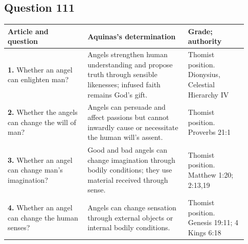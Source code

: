 \subsection{Question 111}
\begin{longtable}{@{}>{\raggedright\arraybackslash}p{0.31\linewidth}>{\raggedright\arraybackslash}p{0.39\linewidth}>{\raggedright\arraybackslash}p{0.23\linewidth}@{}}
\toprule
Article and question & Aquinas's determination & Grade; authority\\
\midrule\endhead
\textbf{1.} Whether an angel can enlighten man? & Angels strengthen human understanding and propose truth through sensible likenesses; infused faith remains God's gift. & Thomist position. Dionysius, Celestial Hierarchy IV\\
\textbf{2.} Whether the angels can change the will of man? & Angels can persuade and affect passions but cannot inwardly cause or necessitate the human will's assent. & Thomist position. Proverbs 21:1\\
\textbf{3.} Whether an angel can change man's imagination? & Good and bad angels can change imagination through bodily conditions; they use material received through sense. & Thomist position. Matthew 1:20; 2:13,19\\
\textbf{4.} Whether an angel can change the human senses? & Angels can change sensation through external objects or internal bodily conditions. & Thomist position. Genesis 19:11; 4 Kings 6:18\\
\bottomrule
\end{longtable}
